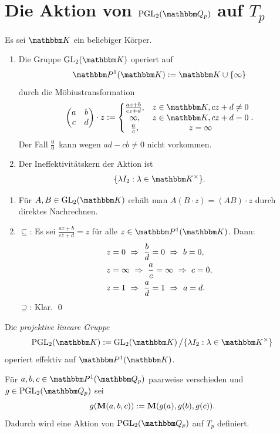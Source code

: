 \documentclass[a4paper, 12pt, twoside]{article}
\begin{document}
\section{Die Aktion von $\PGL_2(\QQ_p)$ auf $T_p$}\label{sec_PGL}

\BEM Es sei $\KK$ ein beliebiger Körper.
\begin{enumerate}
\item Die Gruppe $\GL_2(\KK)$ operiert auf
\[
\PP^1(\KK) := \KK \cup \{\infty\}
\]
durch die Möbiustransformation
\[
\begin{pmatrix}
a & b \\
c & d
\end{pmatrix}\cdot z
:=
\left\{
\begin{matrix}
\frac{az+b}{cz+d}, & z\in\KK, cz+d\neq 0 \\
\infty, & z\in\KK, cz+d = 0 \\
\frac{a}{c}, & z=\infty
\end{matrix}
\right..
\]
Der Fall \glqq$\frac{0}{0}$\grqq\ kann wegen $ad-cb\neq 0$ nicht
vorkommen.
\item Der Ineffektivitätskern der Aktion ist
\[
\{ \lambda I_2 : \lambda\in\KK^\times \}.
\]
\end{enumerate}
\bew \begin{enumerate}
\item Für $A,B\in\GL_2(\KK)$ erhält man $A(B\cdot z)=(AB)\cdot z$
durch direktes Nachrechnen.
\item
\glqq$\subseteq$\grqq:
Es sei $\frac{az+b}{cz+d} = z$ für alle $z\in\PP^1(\KK)$.
Dann:
\begin{align*}
&z=0\ \Rightarrow\ \frac{b}{d}=0\ \Rightarrow\ b=0, \\
&z=\infty\ \Rightarrow\ \frac{a}{c}=\infty\ \Rightarrow\ c=0, \\
&z=1\ \Rightarrow\ \frac{a}{d}=1\ \Rightarrow\ a=d.
\end{align*}
\glqq$\supseteq$\grqq: Klar.
\qed
\end{enumerate}

\FOLG Die \emph{projektive lineare Gruppe}
\[
\PGL_2(\KK) := \GL_2(\KK)\left/\{ \lambda I_2 : \lambda\in\KK^\times\}\right.
\]
operiert effektiv auf $\PP^1(\KK)$.

\PROP Für $a,b,c\in\PP^1(\QQ_p)$ paarweise verschieden und
$g\in\PGL_2(\QQ_p)$ sei
\[
g(\mathbf{M}(a,b,c)) := \mathbf{M}(g(a),g(b),g(c)).
\]
Dadurch wird eine Aktion von $\PGL_2(\QQ_p)$ auf $T_p$ definiert.
\end{document}
